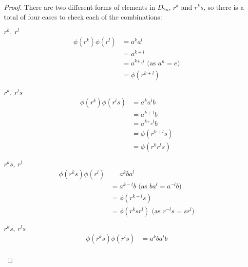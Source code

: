 \documentclass[../main.tex]{subfiles}
\begin{document}
\begin{proof}
  There are two different forms of elements in $D_{2n}$, $r^{k}$ and $r^{k}s$, so there is a total of four cases to check each of the combinations:
  \begin{proofcases}
    \begin{case}{$r^{k},\ r^{l}$}
      \vspace{-2em}
      \begin{align*}
        \phi(r^{k})\phi(r^{l}) &= a^{k}a^{l} \\
                               &= a^{k + l} \\
                               &= a^{k +_n l} \text{ (as $a^{n} = e$)}\\
                               &= \phi(r^{k + l})
      \end{align*}
    \end{case}
    \begin{case}{$r^{k},\ r^{l}s$}
      \vspace{-2em}
      \begin{align*}
        \phi(r^{k})\phi(r^{l}s) &= a^{k} a^{l} b \\
                                &= a^{k + l} b \\
                                &= a^{k +_n l} b \\
                                &= \phi(r^{k + l}s) \\
                                &= \phi(r^{k} r^{l} s)
      \end{align*}
    \end{case}
    \begin{case}{$r^{k}s,\ r^{l}$}
      \vspace{-2em}
      \begin{align*}
        \phi(r^{k}s)\phi(r^{l}) &= a^{k} b a^{l} \\
                                &= a^{k - l} b \text{ (as $ba^{l} = a^{-l}b$)}\\
                                &= \phi(r^{k - l} s) \\
                                &= \phi(r^{k}s r^{l}) \text{ (as $r^{-l}s = sr^{l}$)}
      \end{align*}
    \end{case}
    \begin{case}{$r^{k}s,\ r^{l}s$}
      \vspace{-2em}
      \begin{align*}
        \phi(r^{k}s)\phi(r^{l}s) &= a^{k} b a^{l}b \\

\end{align*}
\end{case}
\end{proofcases}
\end{proof}
\end{document}

